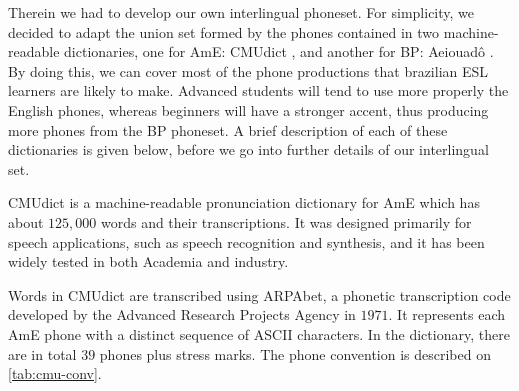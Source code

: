 Therein we had to develop our own interlingual phoneset. For simplicity, we decided to adapt the union set formed 
by the phones contained in two machine-readable dictionaries, one for \ac{AmE}: \ac{CMUdict} \cite{CMU2008}, and another for \ac{BP}: 
Aeiouad\^o \cite{Mendonca2014}. By doing this, we can cover most of the phone productions that brazilian \ac{ESL} learners are likely
to make. Advanced students will tend to use more properly the English phones, whereas beginners will have a stronger accent,
thus producing more phones from the \ac{BP} phoneset. A brief description of each of these dictionaries is given below, before 
we go into further details of our interlingual set.

\ac{CMUdict} \citep{CMU2008} is a machine-readable pronunciation dictionary for \ac{AmE} which has about $125,000$ 
words and their transcriptions. It was designed primarily for speech applications, such as speech recognition and synthesis, 
and it has been widely tested in both Academia and industry.

Words in \ac{CMUdict} are transcribed using ARPAbet, a phonetic transcription code developed by the Advanced Research Projects Agency in 
$1971$. It represents each \ac{AmE} phone with a distinct sequence of \ac{ASCII} characters. In the dictionary, there are in total $39$ 
phones plus stress marks. The phone convention is described on \autoref{tab:cmu-conv}.

